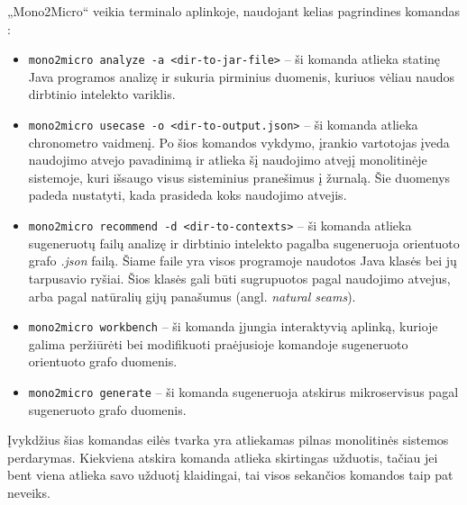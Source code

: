 \documentclass{VUMIFPSbakalaurinis}
\begin{document}
„Mono2Micro“ veikia terminalo aplinkoje, naudojant kelias pagrindines komandas \cite{IBMM2M}:
\begin{itemize}
    \item \verb|mono2micro analyze -a <dir-to-jar-file>| -- ši komanda atlieka statinę Java programos analizę ir sukuria pirminius duomenis, kuriuos vėliau naudos dirbtinio intelekto variklis.

    \item \verb|mono2micro usecase -o <dir-to-output.json>| -- ši komanda atlieka chronometro vaidmenį. Po šios komandos vykdymo, įrankio vartotojas įveda naudojimo atvejo pavadinimą ir atlieka šį naudojimo atvejį monolitinėje sistemoje, kuri išsaugo visus sisteminius pranešimus į žurnalą. Šie duomenys padeda nustatyti, kada prasideda koks naudojimo atvejis.

    \item \verb|mono2micro recommend -d <dir-to-contexts>| -- ši komanda atlieka sugeneruotų failų analizę ir dirbtinio intelekto pagalba sugeneruoja orientuoto grafo \emph{.json} failą. Šiame faile yra visos programoje naudotos Java klasės bei jų tarpusavio ryšiai. Šios klasės gali būti sugrupuotos pagal naudojimo atvejus, arba pagal natūralių gijų panašumus (angl. \emph{natural seams}).

    \item \verb|mono2micro workbench| -- ši komanda įjungia interaktyvią aplinką, kurioje galima peržiūrėti bei modifikuoti praėjusioje komandoje sugeneruoto orientuoto grafo duomenis.

    \item \verb|mono2micro generate| -- ši komanda sugeneruoja atskirus mikroservisus pagal sugeneruoto grafo duomenis.
\end{itemize}

Įvykdžius šias komandas eilės tvarka yra atliekamas pilnas monolitinės sistemos perdarymas. Kiekviena atskira komanda atlieka skirtingas užduotis, tačiau jei bent viena atlieka savo užduotį klaidingai, tai visos sekančios komandos taip pat neveiks. 


\end{document}
